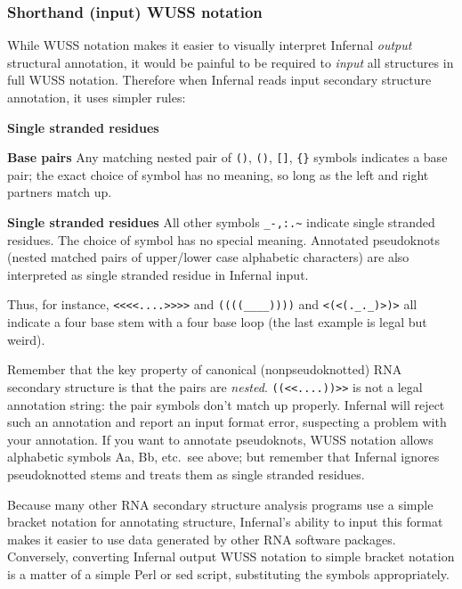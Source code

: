 \subsubsection{Shorthand (input) WUSS notation}

While WUSS notation makes it easier to visually interpret
Infernal \emph{output} structural annotation, it would be
painful to be required to \emph{input} all structures in full WUSS
notation. Therefore when Infernal reads input secondary
structure annotation, it uses simpler rules:

\begin{sreitems}{\textbf{Single stranded residues}}
\item [\textbf{Base pairs}]
  Any matching nested pair of \verb+()+, \verb+()+, \verb+[]+, \verb+{}+
  symbols indicates a base pair; the exact choice of symbol has no
  meaning, so long as the left and right partners match up.

\item [\textbf{Single stranded residues}]
  All other symbols \verb+_-,:.~+ 
  indicate single stranded residues.
  The choice of symbol has no special meaning.
  Annotated pseudoknots (nested matched pairs of upper/lower case
  alphabetic characters) are also interpreted as single
  stranded residue in Infernal input.
\end{sreitems}

Thus, for instance, \verb+<<<<....>>>>+ and \verb+((((____))))+ and
\verb+<(<(._._)>)>+ all indicate a four base stem with a four base
loop (the last example is legal but weird). 

Remember that the key property of canonical (nonpseudoknotted) RNA
secondary structure is that the pairs are \emph{nested}.
\verb+((<<....))>>+ is not a legal annotation string: the pair symbols
don't match up properly. Infernal will reject such an
annotation and report an input format error, suspecting a problem with
your annotation.  If you want to annotate pseudoknots, WUSS notation
allows alphabetic symbols Aa, Bb, etc.\, see above; but remember that
Infernal ignores pseudoknotted stems and treats them as
single stranded residues.

Because many other RNA secondary structure analysis programs use a
simple bracket notation for annotating structure,
Infernal's ability to input this format makes it easier to
use data generated by other RNA software packages. Conversely,
converting Infernal output WUSS notation to simple bracket
notation is a matter of a simple Perl or sed script, substituting the
symbols appropriately.

